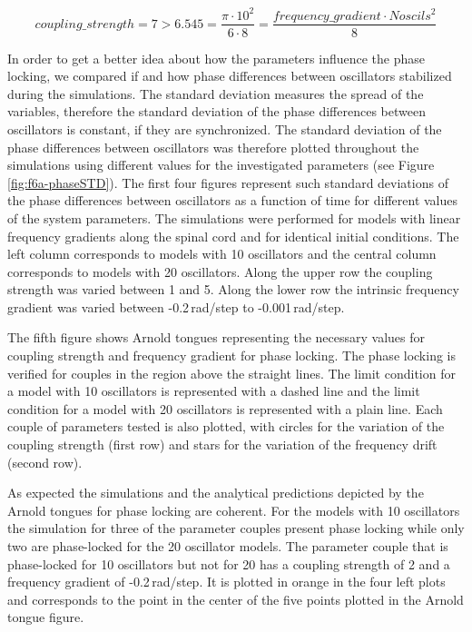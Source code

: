 \documentclass[a4paper]{scrartcl}
\begin{document}
\begin{equation}
	coupling \_ strength = 7 > 6.545 =\frac{\pi \cdot 10^{2}}{6 \cdot 8} = \frac{frequency \_ gradient \cdot Noscils^2}{8}
\end{equation}

In order to get a better idea about how the parameters influence the phase locking, we compared if and how phase differences between oscillators stabilized during the simulations. The standard deviation measures the spread of the variables, therefore the standard deviation of the phase differences between oscillators is constant, if they are synchronized. The standard deviation of the phase differences between oscillators was therefore plotted throughout the simulations using different values for the investigated parameters (see Figure \ref{fig:f6a-phaseSTD}). The first four figures represent such standard deviations of the phase differences between oscillators as a function of time for different values of the system parameters. The simulations were performed for models with linear frequency gradients along the spinal cord and for identical initial conditions. The left column corresponds to models with 10 oscillators and the central column corresponds to models with 20 oscillators. Along the upper row the coupling strength was varied between 1 and 5. Along the lower row the intrinsic frequency gradient was varied between -0.2\,rad/step to -0.001\,rad/step. 

The fifth figure shows Arnold tongues representing the necessary values for coupling strength and frequency gradient for phase locking. The phase locking is verified for couples in the region above the straight lines. The limit condition for a model with 10 oscillators is represented with a dashed line and the limit condition for a model with 20 oscillators is represented with a plain line. Each couple of parameters tested is also plotted, with circles for the variation of the coupling strength (first row) and stars for the variation of the frequency drift (second row).

As expected the simulations and the analytical predictions depicted by the Arnold tongues for phase locking are coherent. For the models with 10 oscillators the simulation for three of the parameter couples present phase locking while only two are phase-locked for the 20 oscillator models. The parameter couple that is phase-locked for 10 oscillators but not for 20 has a coupling strength of 2 and a frequency gradient of -0.2\,rad/step. It is plotted in orange in the four left plots and corresponds to the point in the center of the five points plotted in the Arnold tongue figure.
\end{document}
